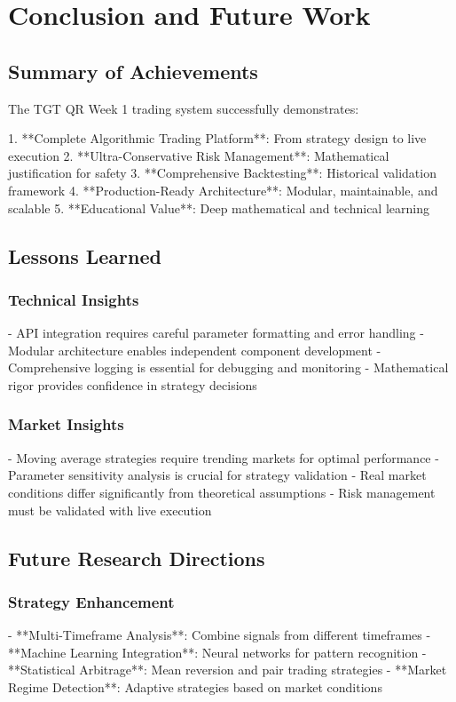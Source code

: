 \documentclass[12pt,a4paper]{article}
\begin{document}
\section{Conclusion and Future Work}

\subsection{Summary of Achievements}

The TGT QR Week 1 trading system successfully demonstrates:

1. **Complete Algorithmic Trading Platform**: From strategy design to live execution
2. **Ultra-Conservative Risk Management**: Mathematical justification for safety
3. **Comprehensive Backtesting**: Historical validation framework
4. **Production-Ready Architecture**: Modular, maintainable, and scalable
5. **Educational Value**: Deep mathematical and technical learning

\subsection{Lessons Learned}

\subsubsection{Technical Insights}
- API integration requires careful parameter formatting and error handling
- Modular architecture enables independent component development
- Comprehensive logging is essential for debugging and monitoring
- Mathematical rigor provides confidence in strategy decisions

\subsubsection{Market Insights}
- Moving average strategies require trending markets for optimal performance
- Parameter sensitivity analysis is crucial for strategy validation
- Real market conditions differ significantly from theoretical assumptions
- Risk management must be validated with live execution

\subsection{Future Research Directions}

\subsubsection{Strategy Enhancement}
- **Multi-Timeframe Analysis**: Combine signals from different timeframes
- **Machine Learning Integration**: Neural networks for pattern recognition
- **Statistical Arbitrage**: Mean reversion and pair trading strategies
- **Market Regime Detection**: Adaptive strategies based on market conditions
\end{document}
